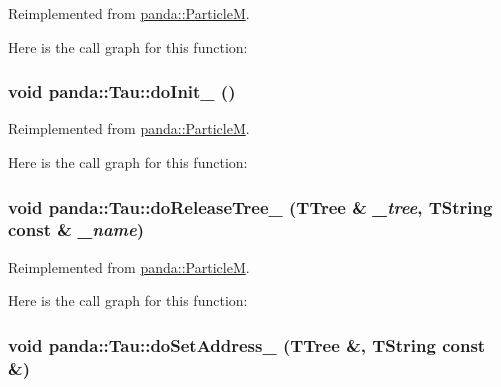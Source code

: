 Reimplemented from \hyperlink{classpanda_1_1ParticleM_a003a63672058369e9bbea413e055b1c1}{panda::ParticleM}.

Here is the call graph for this function:\hypertarget{classpanda_1_1Tau_aed759d7cf1b0e0e47fb34f646e899e5c}{
\subsubsection[{doInit\_\-}]{\setlength{\rightskip}{0pt plus 5cm}void panda::Tau::doInit\_\- ()}}
\label{classpanda_1_1Tau_aed759d7cf1b0e0e47fb34f646e899e5c}


Reimplemented from \hyperlink{classpanda_1_1ParticleM_ae912914e3970c1fb238589f0ccc783f4}{panda::ParticleM}.

Here is the call graph for this function:\hypertarget{classpanda_1_1Tau_a5e28b6235042855a3e9d3b613c5145e5}{
\subsubsection[{doReleaseTree\_\-}]{\setlength{\rightskip}{0pt plus 5cm}void panda::Tau::doReleaseTree\_\- (TTree \& {\em \_\-tree}, \/  TString const \& {\em \_\-name})}}
\label{classpanda_1_1Tau_a5e28b6235042855a3e9d3b613c5145e5}


Reimplemented from \hyperlink{classpanda_1_1ParticleM_a0c24df56cbd50a8223fc4d8bf0b776d0}{panda::ParticleM}.

Here is the call graph for this function:\hypertarget{classpanda_1_1Tau_a49f42dffab89a0699caff1da8d7993ed}{
\subsubsection[{doSetAddress\_\-}]{\setlength{\rightskip}{0pt plus 5cm}void panda::Tau::doSetAddress\_\- (TTree \&, \/  TString const \&)}}
\label{classpanda_1_1Tau_a49f42dffab89a0699caff1da8d7993ed}


